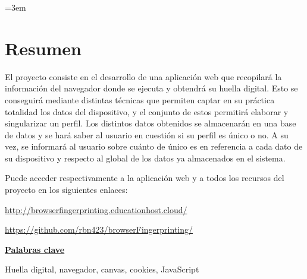 \parindent=3em
\chapter*{Resumen}

El proyecto consiste en el desarrollo de una aplicación web que recopilará la información del navegador donde se ejecuta y obtendrá su huella digital. Esto se conseguirá mediante distintas técnicas que permiten captar en su práctica totalidad los datos del dispositivo, y el conjunto de estos permitirá elaborar y singularizar un perfil. Los distintos datos obtenidos se almacenarán en una base de datos y se hará saber al usuario en cuestión si su perfil es único o no. A su vez, se informará al usuario sobre cuánto de único es en referencia a cada dato de su dispositivo y respecto al global de los datos ya almacenados en el sistema. \par

\noindent
Puede acceder respectivamente a la aplicación web y a todos los recursos del proyecto en los siguientes enlaces: \par
\url{http://browserfingerprinting.educationhost.cloud/} \par

\url{https://github.com/rbn423/browserFingerprinting/} \par

\vspace{12mm}
\noindent
\underline{\Large{\textbf{Palabras clave}}}\par
\vspace{7mm}
\noindent
\normalsize{Huella digital, navegador, canvas, cookies, JavaScript}
